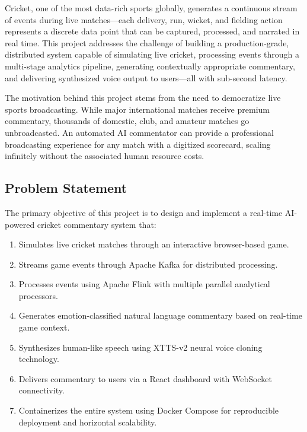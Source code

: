 \documentclass[12pt,a4paper]{article}
\begin{document}
Cricket, one of the most data-rich sports globally, generates a continuous stream of events during live matches---each delivery, run, wicket, and fielding action represents a discrete data point that can be captured, processed, and narrated in real time. This project addresses the challenge of building a production-grade, distributed system capable of simulating live cricket, processing events through a multi-stage analytics pipeline, generating contextually appropriate commentary, and delivering synthesized voice output to users---all with sub-second latency.

The motivation behind this project stems from the need to democratize live sports broadcasting. While major international matches receive premium commentary, thousands of domestic, club, and amateur matches go unbroadcasted. An automated AI commentator can provide a professional broadcasting experience for any match with a digitized scorecard, scaling infinitely without the associated human resource costs.

\subsection{Problem Statement}
The primary objective of this project is to design and implement a real-time AI-powered cricket commentary system that:
\begin{enumerate}
\item Simulates live cricket matches through an interactive browser-based game.
\item Streams game events through Apache Kafka for distributed processing.
\item Processes events using Apache Flink with multiple parallel analytical processors.
\item Generates emotion-classified natural language commentary based on real-time game context.
\item Synthesizes human-like speech using XTTS-v2 neural voice cloning technology.
\item Delivers commentary to users via a React dashboard with WebSocket connectivity.
\item Containerizes the entire system using Docker Compose for reproducible deployment and horizontal scalability.
\end{enumerate}
\end{document}
